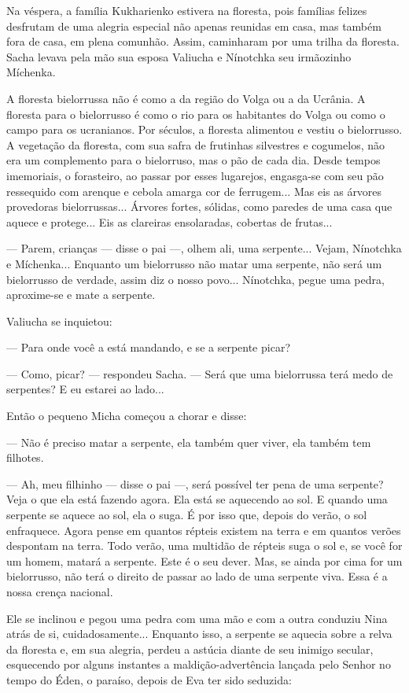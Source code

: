 Na véspera, a família Kukharienko estivera na floresta, pois famílias
felizes desfrutam de uma alegria especial não apenas reunidas em casa,
mas também fora de casa, em plena comunhão. Assim, caminharam por uma
trilha da floresta. Sacha levava pela mão sua esposa Valiucha e
Nínotchka seu irmãozinho Míchenka.

A floresta bielorrussa não é como a da região do Volga ou a da Ucrânia.
A floresta para o bielorrusso é como o rio para os habitantes do Volga
ou como o campo para os ucranianos. Por séculos, a floresta alimentou e
vestiu o bielorrusso. A vegetação da floresta, com sua safra de
frutinhas silvestres e cogumelos, não era um complemento para o
bielorruso, mas o pão de cada dia. Desde tempos imemoriais, o
forasteiro, ao passar por esses lugarejos, engasga-se com seu pão
ressequido com arenque e cebola amarga cor de ferrugem... Mas eis as
árvores provedoras bielorrussas... Árvores fortes, sólidas, como paredes
de uma casa que aquece e protege... Eis as clareiras ensolaradas,
cobertas de frutas...

--- Parem, crianças --- disse o pai ---, olhem ali, uma serpente...
Vejam, Nínotchka e Míchenka... Enquanto um bielorrusso não matar uma
serpente, não será um bielorrusso de verdade, assim diz o nosso povo...
Nínotchka, pegue uma pedra, aproxime-se e mate a serpente.

Valiucha se inquietou:

--- Para onde você a está mandando, e se a serpente picar?

--- Como, picar? --- respondeu Sacha. --- Será que uma bielorrussa terá
medo de serpentes? E eu estarei ao lado...

Então o pequeno Micha começou a chorar e disse:

--- Não é preciso matar a serpente, ela também quer viver, ela também
tem filhotes.

--- Ah, meu filhinho --- disse o pai ---, será possível ter pena de uma
serpente? Veja o que ela está fazendo agora. Ela está se aquecendo ao
sol. E quando uma serpente se aquece ao sol, ela o suga. É por isso que,
depois do verão, o sol enfraquece. Agora pense em quantos répteis
existem na terra e em quantos verões despontam na terra. Todo verão, uma
multidão de répteis suga o sol e, se você for um homem, matará a
serpente. Este é o seu dever. Mas, se ainda por cima for um bielorrusso,
não terá o direito de passar ao lado de uma serpente viva. Essa é a
nossa crença nacional.

Ele se inclinou e pegou uma pedra com uma mão e com a outra conduziu
Nina atrás de si, cuidadosamente... Enquanto isso, a serpente se aquecia
sobre a relva da floresta e, em sua alegria, perdeu a astúcia diante de
seu inimigo secular, esquecendo por alguns instantes a
maldição-advertência lançada pelo Senhor no tempo do Éden, o paraíso,
depois de Eva ter sido seduzida:

